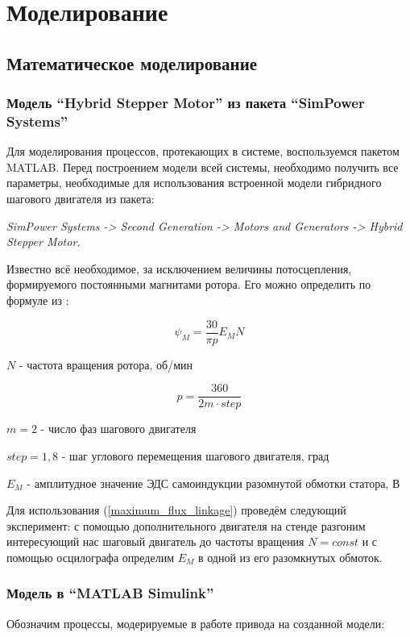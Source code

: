 \newpage
\section{Моделирование}

\subsection{Математическое моделирование}

\subsubsection{Модель ``Hybrid Stepper Motor'' из пакета ``SimPower Systems''}

Для моделирования процессов, протекающих в системе, воспользуемся пакетом MATLAB.
Перед построением модели всей системы, необходимо получить все параметры,
необходимые для использования встроенной модели гибридного шагового двигателя из пакета:

\textit{SimPower Systems -> Second Generation -> Motors and Generators -> Hybrid Stepper Motor.}

Известно всё необходимое, за исключением величины потосцепления, формируемого
постоянными магнитами ротора. Его можно определить по формуле
из \cite{Matlab_help_stepper_motor}:

\begin{equation}
    \label{maximum_flux_linkage}
    \psi_{M} = \frac{30}{\pi p} E_{M} N
\end{equation}

$N$ - частота вращения ротора, об/мин

$$
    p = \frac{360}{2m \cdot step}
$$

$m = 2$ - число фаз шагового двигателя

$step = 1,8$ - шаг углового перемещения шагового двигателя, град

$E_{M}$ - амплитудное значение ЭДС самоиндукции разомнутой обмотки статора, В

Для использования (\ref{maximum_flux_linkage}) проведём следующий эксперимент:
с помощью дополнительного двигателя на стенде разгоним интересующий нас шаговый
двигатель до частоты вращения $N = const$ и с помощью осцилографа определим $E_{M}$
в одной из его разомкнутых обмоток.

\subsubsection{Модель в ``MATLAB Simulink''}
Обозначим процессы, модерируемые в работе привода на созданной модели:

